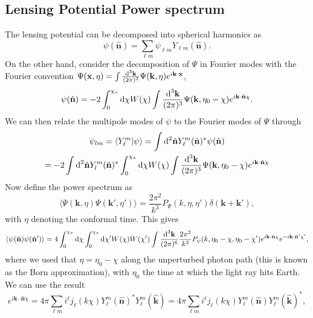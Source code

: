 \documentclass[11pt]{article} %
\DeclareRobustCommand{\d}{\ifmmode\text{d}\else d\fi}
\begin{document}
\subsection{Lensing Potential Power spectrum}
The lensing potential can be decomposed into spherical harmonics as
\begin{equation}
    \psi(\hat{\mathbf n}) = \sum_{\ell m} \psi_{\ell m}Y_{\ell m}(\hat{\mathbf n}).
\end{equation}
On the other hand, consider the decomposition of $\Psi$ in Fourier modes with the Fourier convention $\Psi(\mathbf x, \eta)=\int\frac{\d^3 \mathbf k}{(2\pi)^{3}}\Psi(\mathbf k, \eta)e^{i\mathbf k \cdot\mathbf x}$,
\begin{equation}
    \psi(\hat{\mathbf n}) = -2 \int_0^{\chi_*}\d \chi W(\chi) \int\frac{\d^3 \mathbf k}{(2\pi)^{3}}\Psi(\mathbf k, \eta_0 - \chi)e^{i\mathbf k \cdot\hat{\mathbf n}\chi}.
\end{equation}
We can then relate the multipole modes of $\psi$ to the Fourier modes of $\Psi$ through %
\begin{gather}
    \psi_{lm} = \langle Y_\ell^m | \psi \rangle = \int\d^2\hat{\mathbf n} Y_\ell^m(\hat{\mathbf n})^* \psi(\hat{\mathbf n})\\ 
    = -2\int\d^2\hat{\mathbf n} Y_l^m(\hat{\mathbf n})^* \int_0^{\chi_*}\d \chi W(\chi) \int\frac{\d^3 \mathbf k}{(2\pi)^{3}}\Psi(\mathbf k, \eta_0 - \chi)e^{i\mathbf k \cdot\hat{\mathbf n}\chi}
\end{gather}
Now define the power spectrum as
\begin{equation}
    \langle \Psi(\mathbf k, \eta)\Psi(\mathbf k',\eta')\rangle = \frac{2\pi^2}{k^3}P_\Psi(k, \eta, \eta')\delta(\mathbf k + \mathbf k'),
\end{equation}
with $\eta$ denoting the conformal time. This gives 
\begin{equation}
    \langle \psi(\hat{\mathbf n})\psi(\hat{\mathbf n}') \rangle = 4\int_0^{\chi_*}\d \chi\int_0^{\chi_*}\d \chi' W(\chi)W(\chi')\int \frac{\d^3\mathbf k}{(2\pi)^6}\frac{2\pi^2}{k^3}P_\psi(k,\eta_0 - \chi, \eta_0-\chi')e^{i\mathbf k\cdot\hat {\mathbf n}\chi}e^{-i\mathbf k\cdot\hat {\mathbf n}'\chi'},
\end{equation}
where we used that $\eta = \eta_0 - \chi$ along the unperturbed photon path (this is known as the Born approximation), with $\eta_0$ the time at which the light ray hits Earth. 
We can use the result
\begin{equation}
    e^{i\mathbf k \cdot \hat {\mathbf n}\chi}=4\pi\sum_{\ell m}i^\ell j_\ell(k\chi )Y_\ell^m(\hat{\mathbf n})^*Y_\ell^m(\hat{\mathbf k}) = 4\pi\sum_{\ell m}i^\ell j_\ell(k\chi )Y_\ell^m(\hat{\mathbf n})Y_\ell^m(\hat{\mathbf k})^*, \label{eq:complexexp}
\end{equation}
\end{document}
